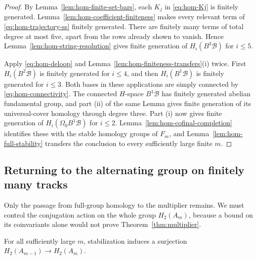 \begin{proof}
By Lemma~\ref{lem:hom-finite-set-bars}, each $K_j$ in
\eqref{eq:hom-Kj} is finitely generated.
Lemma~\ref{lem:hom-coefficient-finiteness} makes every relevant
term of \eqref{eq:hom-trajectory-ss} finitely generated.
There are finitely many terms of total degree at most five,
apart from the rows already shown to vanish.  Hence
Lemma~\ref{lem:hom-string-resolution} gives finite generation
of $H_i(B^3\mathcal B)$ for $i\leq5$.

Apply \eqref{eq:hom-deloop} and
Lemma~\ref{lem:hom-finiteness-transfers}(i) twice.  First
$H_i(B^2\mathcal B)$ is finitely generated for $i\leq4$, and
then $H_i(B^1\mathcal B)$ is finitely generated for $i\leq3$.
Both bases in these applications are simply connected by
\eqref{eq:hom-connectivity}.  The connected $H$-space
$B^1\mathcal B$ has finitely generated abelian fundamental
group, and part (ii) of the same Lemma gives finite generation
of its universal-cover homology through degree three.  Part (i)
now gives finite generation of
$H_i(\Omega_0 B^1\mathcal B)$ for $i\leq2$.
Lemma~\ref{lem:hom-cofinal-completion} identifies these with
the stable homology groups of $F_m$, and
Lemma~\ref{lem:hom-full-stability} transfers the conclusion to
every sufficiently large finite $m$.
\end{proof}

\subsection{Returning to the alternating group on finitely many tracks}

Only the passage from full-group homology to the multiplier
remains.  We must control the conjugation action on the whole
group $H_2(A_m)$, because a bound on its coinvariants alone would
not prove Theorem~\ref{thm:multiplier}.

\begin{lemma}\label{lem:hom-alternating-surjection}
For all sufficiently large $m$, stabilization induces a
surjection $H_2(A_{m-1})\to H_2(A_m)$.
\end{lemma}

